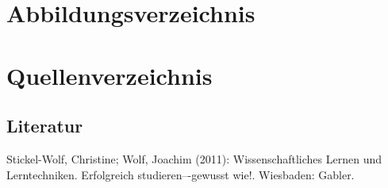\documentclass[a4paper,12pt,oneside]{article}
\begin{document}
  \newpage
  \tableofcontents
  
  \newpage
  \pagestyle{fancy} %
  

  \section*{Abbildungsverzeichnis}
  \renewcommand{\listfigurename}{} %
  \thispagestyle{empty}
  \listoffigures
  
  

  
  
  
  
    

  \newpage
  \thispagestyle{empty}
  \section{Quellenverzeichnis}
    \subsection{Literatur}
    \renewcommand{\refname}{} %
    \begin{thebibliography}{SW11} %
       Stickel-Wolf, Christine; Wolf, Joachim (2011): Wissenschaftliches Lernen und Lerntechniken. Erfolgreich studieren–-gewusst wie!. Wiesbaden: Gabler. 
    \end{thebibliography} 
        
\end{document}
